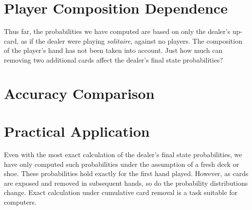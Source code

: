 \section{Player Composition Dependence}
\label{sec:dealer:composition}

Thus far, the probabilities we have computed are based on
only the dealer's up-card, as if the dealer were playing \emph{solitaire},
against no players.  
The composition of the player's hand has not been taken into account.
Just how much can removing two additional cards affect the 
dealer's final state probabilities?

\section{Accuracy Comparison}
\label{sec:dealer:accuracy}

\section{Practical Application}
\label{sec:dealer:practical}

Even with the most exact calculation of the dealer's final state 
probabilities, we have only computed such probabilities 
under the assumption of a fresh deck or shoe.
These probabilities hold exactly for the first hand played.  
However, as cards are exposed and removed in subsequent hands, 
so do the probability distributions change.  
Exact calculation under cumulative card removal is a task
suitable for computers.  

